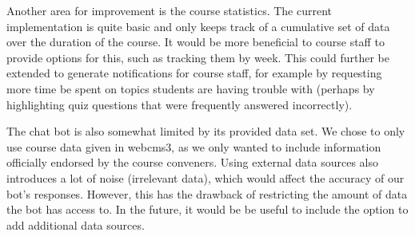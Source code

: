 Another area for improvement is the course statistics. The current implementation is quite basic and only keeps track of a cumulative set of data over the duration of the course. It would be more beneficial to course staff to provide options for this, such as tracking them by week. This could further be extended to generate notifications for course staff, for example by requesting more time be spent on topics students are having trouble with (perhaps by highlighting quiz questions that were frequently answered incorrectly).

The chat bot is also somewhat limited by its provided data set. We chose to only use course data given in webcms3, as we only wanted to include information officially endorsed by the course  conveners. Using external data sources also introduces a lot of noise (irrelevant data), which would affect the accuracy of our bot's responses. However, this has the drawback of restricting the amount of data the bot has access to. In the future, it would be be useful to include the option to add additional data sources.

\newpage
